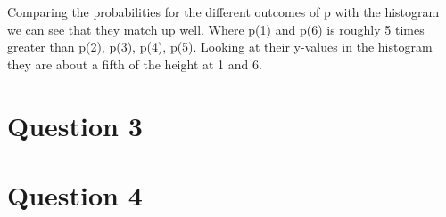 \documentclass{article}
\begin{document}
Comparing the probabilities for the different outcomes of p with the histogram we can see that they match up well. Where p(1) and p(6) is roughly 5 times greater than p(2), p(3), p(4), p(5). 
Looking at their y-values in the histogram they are about a fifth of the height at 1 and 6.

\section{Question 3}
\section{Question 4}
\end{document}
